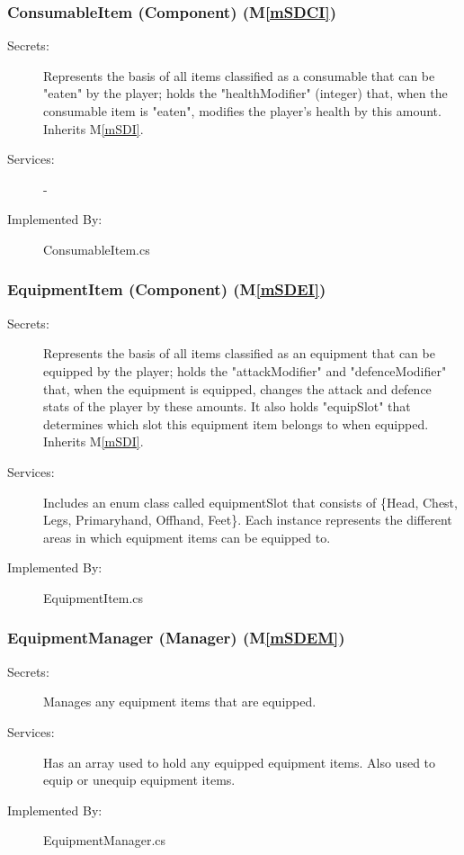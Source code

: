 \documentclass[12pt, titlepage]{article}
\newcommand{\mref}[1]{M\ref{#1}}
\begin{document}
\subsubsection{ConsumableItem (Component) (\mref{mSDCI})}

\begin{description}
\item[Secrets:] Represents the basis of all items classified as a consumable that can be "eaten" by the player; holds the "healthModifier" (integer) that, when the consumable item is "eaten", modifies the player's health by this amount. Inherits \mref{mSDI}.
\item[Services:] -
\item[Implemented By:] ConsumableItem.cs
\end{description}

\subsubsection{EquipmentItem (Component) (\mref{mSDEI})}

\begin{description}
\item[Secrets:] Represents the basis of all items classified as an equipment that can be equipped by the player; holds the "attackModifier" and "defenceModifier" that, when the equipment is equipped, changes the attack and defence stats of the player by these amounts. It also holds "equipSlot" that determines which slot this equipment item belongs to when equipped. Inherits \mref{mSDI}.
\item[Services:] Includes an enum class called equipmentSlot that consists of \{Head, Chest, Legs, Primaryhand, Offhand, Feet\}. Each instance represents the different areas in which equipment items can be equipped to.
\item[Implemented By:] EquipmentItem.cs
\end{description}

\subsubsection{EquipmentManager (Manager) (\mref{mSDEM})}

\begin{description}
\item[Secrets:] Manages any equipment items that are equipped. 
\item[Services:] Has an array used to hold any equipped equipment items. {\color {magenta} Also used to equip or unequip equipment items.}
\item[Implemented By:] EquipmentManager.cs
\end{description}
\end{document}
